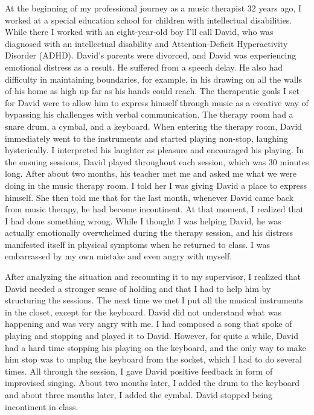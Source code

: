 \documentclass[authordate, empirical, issue]{jote-new-article}
\begin{document}
At the beginning of my professional journey as a music therapist 32 years ago, I worked at a special education school for children with intellectual disabilities. While there I worked with an eight-year-old boy I'll call David, who was diagnosed with an intellectual disability and Attention-Deficit Hyperactivity Disorder (ADHD). David's parents were divorced, and David was experiencing emotional distress as a result. He suffered from a speech delay. He also had difficulty in maintaining boundaries, for example, in his drawing on all the walls of his home as high up far as his hands could reach. The therapeutic goals I set for David were to allow him to express himself through music as a creative way of bypassing his challenges with verbal communication. The therapy room had a snare drum, a cymbal, and a keyboard. When entering the therapy room, David immediately went to the instruments and started playing non-stop, laughing hysterically. I interpreted his laughter as pleasure and encouraged his playing. In the ensuing sessions, David played throughout each session, which was 30 minutes long. After about two months, his teacher met me and asked me what we were doing in the music therapy room. I told her I was giving David a place to express himself. She then told me that for the last month, whenever David came back from music therapy, he had become incontinent. At that moment, I realized that I had done something wrong. While I thought I was helping David, he was actually emotionally overwhelmed during the therapy session, and his distress manifested itself in physical symptoms when he returned to class. I was embarrassed by my own mistake and even angry with myself.



After analyzing the situation and recounting it to my supervisor, I realized that David needed a stronger sense of holding and that I had to help him by structuring the sessions. The next time we met I put all the musical instruments in the closet, except for the keyboard. David did not understand what was happening and was very angry with me. I had composed a song that spoke of playing and stopping and played it to David. However, for quite a while, David had a hard time stopping his playing on the keyboard, and the only way to make him stop was to unplug the keyboard from the socket, which I had to do several times. All through the session, I gave David positive feedback in form of improvised singing. About two months later, I added the drum to the keyboard and about three months later, I added the cymbal. David stopped being incontinent in class.
\end{document}
